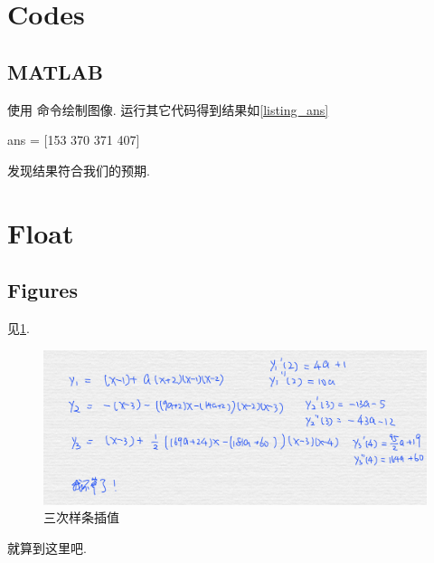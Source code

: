 \documentclass[a4paper, 12pt]{ctexart}
\title{\TITLE}
\author{\AUTHOR}
\date{\today}
\let\oldlstinputlisting
\renewcommand{}[2][\empty]{
    \par\nolinenumbers\oldlstinputlisting[#1]{#2}\linenumbers\par
}
\let\oldlstlisting\lstlisting
\let\oldendlstlisting\endlstlisting
\renewenvironment{lstlisting}
    {\par\nolinenumbers\oldlstlisting}
    {\oldendlstlisting\endnolinenumbers\par}
\renewcommand{\lstinline}[2][]{\colorbox{lightgray}{\oldlstinline[#1]{#2}}}
\newcommand{\matlabinline}[1]{
    \lstinline[style=MATLAB-editor, basicstyle=\mlttfamily]{#1}}
\theoremstyle{plain}
\theoremstyle{plain}
\theoremstyle{plain}
\theoremstyle{nonumberplain}
\begin{document}

    \maketitle
    \thispagestyle{empty}



    \newpage
    \tableofcontents


    \newpage
    \pagestyle{fancy}
    \linenumbers

    \section{Codes}

    \subsection{MATLAB}

    
    使用\matlabinline{plot}命令绘制图像.
    运行其它代码得到结果如\ref{listing_ans}
    \begin{lstlisting}[
        caption=answer,
        label={listing_ans},
        style=MATLAB-editor,
        basicstyle=\mlttfamily\scriptsize,
        numberstyle={\color{black!33}\scriptsize\sffamily}
    ]
        ans = [153 370 371 407]
    \end{lstlisting}
    发现结果符合我们的预期.

    \section{Float}

    \subsection{Figures}

    见\ref{figure_spline}.
    \begin{figure}[H]
        \centering
        \includegraphics[scale=0.2]{figure.jpg}
        \caption{三次样条插值}
        \label{figure_spline}
    \end{figure}
    就算到这里吧.
\end{document}
